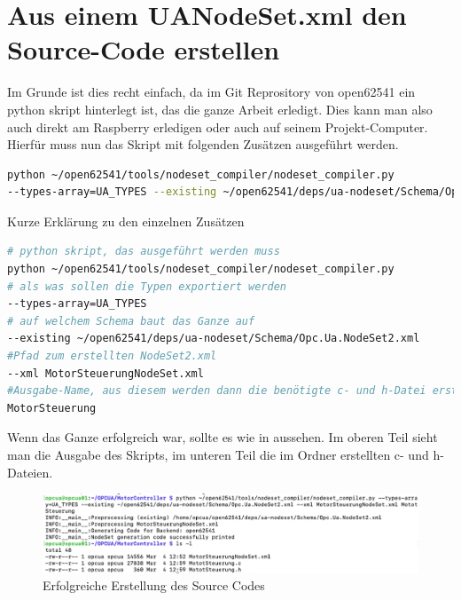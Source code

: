 \section{Aus einem UANodeSet.xml den Source-Code erstellen}
Im Grunde ist dies recht einfach, da im Git Reprository von open62541 ein python skript hinterlegt ist, das die ganze Arbeit erledigt. Dies kann man also auch direkt am Raspberry erledigen oder auch auf seinem Projekt-Computer.
Hierfür muss nun das Skript mit folgenden Zusätzen ausgeführt werden.
\begin{lstlisting}[language=Bash]
python ~/open62541/tools/nodeset_compiler/nodeset_compiler.py 
--types-array=UA_TYPES --existing ~/open62541/deps/ua-nodeset/Schema/Opc.Ua.NodeSet2.xml --xml MotorSteuerungNodeSet.xml MotorSteuerung
\end{lstlisting}
Kurze Erklärung zu den einzelnen Zusätzen
\begin{lstlisting}[language=Bash]
# python skript, das ausgeführt werden muss
python ~/open62541/tools/nodeset_compiler/nodeset_compiler.py
# als was sollen die Typen exportiert werden
--types-array=UA_TYPES
# auf welchem Schema baut das Ganze auf
--existing ~/open62541/deps/ua-nodeset/Schema/Opc.Ua.NodeSet2.xml
#Pfad zum erstellten NodeSet2.xml
--xml MotorSteuerungNodeSet.xml
#Ausgabe-Name, aus diesem werden dann die benötigte c- und h-Datei erstellt
MotorSteuerung
\end{lstlisting}
Wenn das Ganze erfolgreich war, sollte es wie in  aussehen. Im oberen Teil sieht man die Ausgabe des Skripts, im unteren Teil die im Ordner erstellten c- und h-Dateien.
\begin{figure}[H]
	\centering
	\includegraphics[width=1\linewidth]{abb/ErfolgSource}
	\caption{Erfolgreiche Erstellung des Source Codes}
	\label{fig:erfolgsource}
\end{figure}
\clearpage
